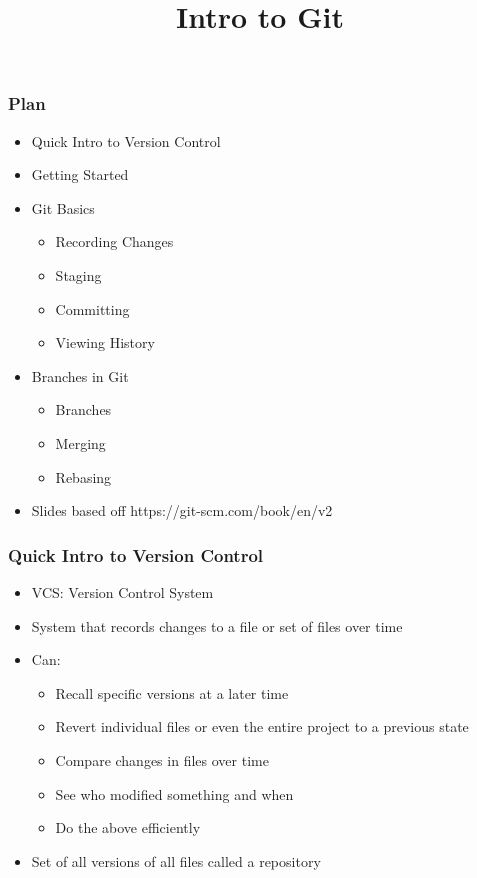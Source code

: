 \documentclass{beamer}
\title{Intro to Git}
\date{}
\begin{document}
\frame{\titlepage}

\begin{frame}
	\frametitle{Plan}
	\begin{itemize}
		\item{Quick Intro to Version Control}
		\item{Getting Started}
		\item{Git Basics}
		\begin{itemize}
			\item{Recording Changes}
			\item{Staging}
			\item{Committing}
			\item{Viewing History}
		\end{itemize}
		\item{Branches in Git}
		\begin{itemize}
			\item{Branches}
			\item{Merging}
			\item{Rebasing}
		\end{itemize}
		\item{Slides based off https://git-scm.com/book/en/v2}
	\end{itemize}

\end{frame}


\begin{frame}
	\frametitle{Quick Intro to Version Control}
	\begin{itemize}
		\item{VCS: Version Control System}
		\item{System that records changes to a file or set of files over time}
		\item{Can:}
		\begin{itemize}
			\item{Recall specific versions at a later time}
			\item{Revert individual files or even the entire project to a previous state}
			\item{Compare changes in files over time}
			\item{See who modified something and when}
			\item{Do the above efficiently}
		\end{itemize}
		\item{Set of all versions of all files called a repository}
	\end{itemize}
\end{frame}
\end{document}
